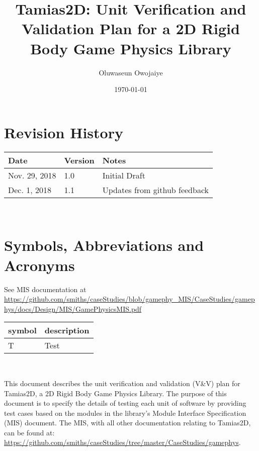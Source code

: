 \documentclass[12pt, titlepage]{article}
\newcommand{\progname}{Tamias2D}
\begin{document}
\title{Tamias2D: Unit Verification and Validation Plan for a 2D Rigid Body Game Physics Library} 
\author{Oluwaseun Owojaiye}
\date{\today}
	
\maketitle


\section{Revision History}

\begin{tabularx}{\textwidth}{p{3cm}p{2cm}X}
\toprule {\bf Date} & {\bf Version} & {\bf Notes}\\
\midrule
Nov. 29, 2018 & 1.0 & Initial Draft\\
Dec. 1, 2018 & 1.1 & Updates from github feedback\\
\bottomrule
\end{tabularx}

~\newpage

\section{Symbols, Abbreviations and Acronyms}
See MIS documentation at \url{https://github.com/smiths/caseStudies/blob/gamephy_MIS/CaseStudies/gamephys/docs/Design/MIS/GamePhysicsMIS.pdf} \\
\renewcommand{\arraystretch}{1.2}
\begin{tabular}{l l} 
  \toprule		
  \textbf{symbol} & \textbf{description}\\
  \midrule 
  T & Test\\
  \bottomrule
\end{tabular}\\


\newpage

\tableofcontents

\listoftables

\listoffigures

\newpage


This document describes the unit verification and validation (V\&V) plan for \progname, a 2D Rigid Body Game Physics Library. The purpose of this document is to specify the details of testing each unit of software by providing test cases based on the modules in the library's Module Interface Specification (MIS) document. The MIS, with all other documentation relating to \progname{}, can be found at: \url{https://github.com/smiths/caseStudies/tree/master/CaseStudies/gamephys}.
\end{document}
